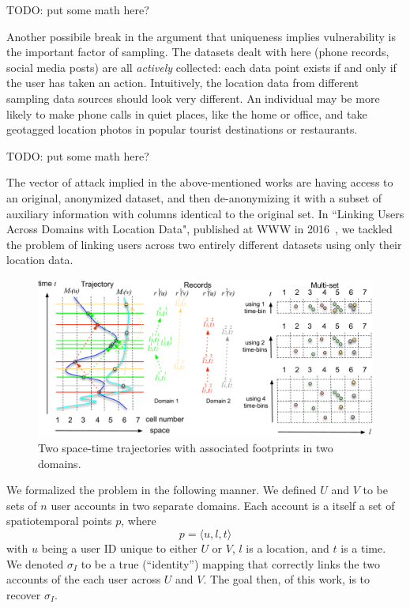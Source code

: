 TODO: put some math here?

Another possibile break in the argument that uniqueness implies vulnerability is the important factor of sampling.
The datasets dealt with here (phone records, social media posts) are all \emph{actively} collected: each data point exists if and only if the user has taken an action.
Intuitively, the location data from different sampling data sources should look very different.
An individual may be more likely to make phone calls in quiet places, like the home or office, and take geotagged location photos in popular tourist destinations or restaurants.

TODO: put some math here?

The vector of attack implied in the above-mentioned works are having access to an original, anonymized dataset, and then de-anonymizing it with a subset of auxiliary information with columns identical to the original set.
In ``Linking Users Across Domains with Location Data", published at WWW in 2016~\cite{riederer2016linking}, we tackled the problem of linking users across two entirely different datasets using only their location data.

\begin{figure}[t]
  \begin{center}
    \includegraphics[width=0.65\linewidth]{fig/linking_explain.pdf}
  \end{center}
  \caption{Two space-time trajectories with associated footprints in two domains.}
  \label{fig:linking_explain}
\end{figure}

We formalized the problem in the following manner.
We defined $U$ and $V$ to be sets of $n$ user accounts in two separate domains.
Each account is a itself a set of spatiotemporal points $p$, where
\[ p = \langle u, l, t \rangle \]
with $u$ being a user ID unique to either $U$ or $V$, $l$ is a location, and $t$ is a time.
We denoted $\sigma_I$ to be a true (``identity'') mapping that correctly links the two accounts of the each user across $U$ and $V$.
The goal then, of this work, is to recover $\sigma_I$.
    
